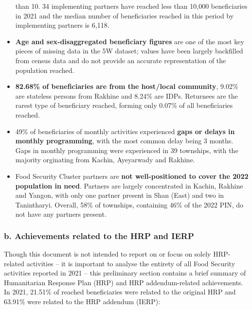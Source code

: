 \documentclass[
]{article}
\begin{document}
\begin{itemize}
  than 10. 34 implementing partners have reached less than 10,000
  beneficiaries in 2021 and the median number of beneficiaries reached
  in this period by implementing partners is 6,118.
\item
  \textbf{Age and sex-disaggregated beneficiary figures} are one of the
  most key pieces of missing data in the 5W dataset; values have been
  largely backfilled from census data and do not provide an accurate
  representation of the population reached.
\item
  \textbf{82.68\% of beneficiaries are from the host/local community},
  9.02\% are stateless persons from Rakhine and 8.24\% are IDPs.
  Returnees are the rarest type of beneficiary reached, forming only
  0.07\% of all beneficiaries reached.
\item
  49\% of beneficiaries of monthly activities experienced \textbf{gaps
  or delays in monthly programming}, with the most common delay being 3
  months. Gaps in monthly programming were experienced in 39 townships,
  with the majority orginating from Kachin, Ayeyarwady and Rakhine.
\item
  Food Security Cluster partners are \textbf{not well-positioned to
  cover the 2022 population in need}. Partners are largely concentrated
  in Kachin, Rakhine and Yangon, with only one partner present in Shan
  (East) and two in Tanintharyi. Overall, 58\% of townships, containing
  46\% of the 2022 PIN, do not have any partners present.
\end{itemize}

\hypertarget{b.-achievements-related-to-the-hrp-and-ierp}{%
\subsubsection{b. Achievements related to the HRP and
IERP}\label{b.-achievements-related-to-the-hrp-and-ierp}}

Though this document is not intended to report on or focus on solely
HRP-related activities -- it is important to analyse the entirety of all
Food Security activities reported in 2021 -- this preliminary section
contains a brief summary of Humanitarian Response Plan (HRP) and HRP
addendum-related achievements. In 2021, 21.51\% of reached beneficiaries
were related to the original HRP and 63.91\% were related to the HRP
addendum (IERP):
\end{document}

